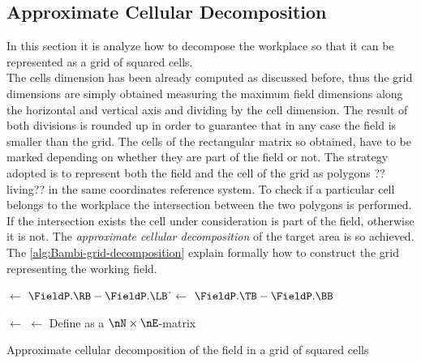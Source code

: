 \subsection{Approximate Cellular Decomposition} %
\label{sub:approximate_cellular_decomposition}
In this section it is analyze how to decompose the workplace so that it can be represented as a grid of squared cells.\\
The cells dimension has been already computed as discussed before, thus the grid dimensions are simply obtained measuring the maximum field dimensions along the horizontal and vertical axis and dividing by the cell dimension. The result of both divisions is rounded up in order to guarantee that in any case the field is smaller than the grid. The cells of the rectangular matrix so obtained, have to be marked depending on whether they are part of the field or not. The strategy adopted is to represent both the field and the cell of the grid as polygons ??living?? in the same coordinates reference system. To check if a particular cell belongs to the workplace the intersection between the two polygons is performed. If the intersection exists the cell under consideration is part of the field, otherwise it is not. The \textit{approximate cellular decomposition} of the target area is so achieved. The \autoref{alg:Bambi-grid-decomposition} explain formally how to construct the grid representing the working field.
\begin{algorithm}[tbh]
	
	\BlankLine
	
	\w $\leftarrow$ $\FieldP.\RB - \FieldP.\LB$ \;
	\h $\leftarrow$ $\FieldP.\TB - \FieldP.\BB$ \;

	\nE $\leftarrow$ \Ceil{$\w / \l$} \;
	\nN $\leftarrow$ \Ceil{$\h / \l$} \;
	Define \Matrix as a $\nN\times\nE$-matrix\;
\caption{Approximate cellular decomposition of the field in a grid of squared cells}
\label{alg:Bambi-grid-decomposition}
\end{algorithm}
